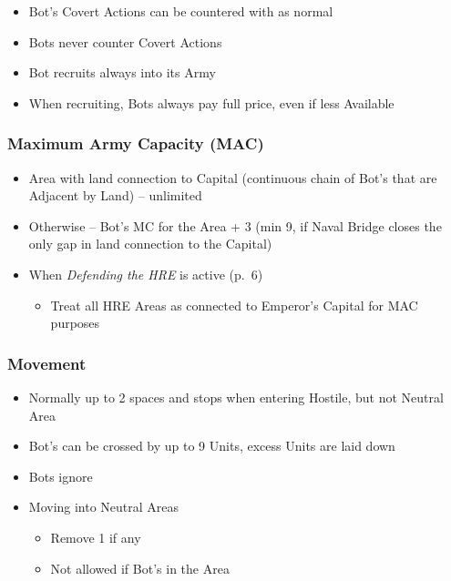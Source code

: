 \documentclass[10pt]{article}
\begin{document}
\begin{itemize}
	\item Bot's Covert Actions can be countered with  as normal
	\item Bots never counter Covert Actions 
\end{itemize}

\begin{itemize}
	\item Bot recruits always into its Army
	\item When recruiting, Bots always pay full \botpower price, even if less Available \manpower
\end{itemize}

\subsubsection*{Maximum Army Capacity (MAC)}
\begin{itemize}
	\item Area with land connection to Capital (continuous chain of Bot's \towns that are Adjacent by Land) -- unlimited
	\item Otherwise -- Bot's MC for the Area + 3 (min 9, if Naval Bridge closes the only gap in land connection to the Capital)
	\item When \emph{Defending the HRE} is active (p.~6)
	\begin{itemize}
		\item Treat all HRE Areas as connected to Emperor's Capital for MAC purposes
	\end{itemize}
\end{itemize}

\subsubsection*{Movement}
\begin{itemize}
	\item Normally up to 2 spaces and stops when entering Hostile, but not Neutral Area
	\item Bot's  can be crossed by up to 9 Units, excess Units are laid down
	\item Bots ignore 
	\item Moving into Neutral Areas
	\begin{itemize}
		\item Remove 1 \influence if any
		\item Not allowed if Bot's \claim in the Area
	\end{itemize}
\end{itemize}
\end{document}
